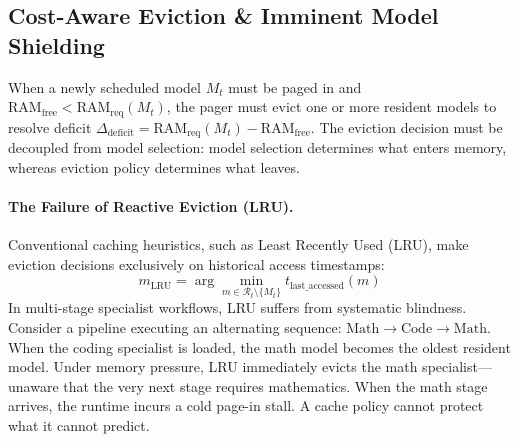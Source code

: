 \subsection{Cost-Aware Eviction \& Imminent Model Shielding}
\label{sec:cost_aware_eviction}

When a newly scheduled model $M_t$ must be paged in and $\text{RAM}_{\text{free}} < \text{RAM}_{\text{req}}(M_t)$, the pager must evict one or more resident models to resolve deficit $\Delta_{\text{deficit}} = \text{RAM}_{\text{req}}(M_t) - \text{RAM}_{\text{free}}$. The eviction decision must be decoupled from model selection: model selection determines what enters memory, whereas eviction policy determines what leaves.

\paragraph{The Failure of Reactive Eviction (LRU).}
Conventional caching heuristics, such as Least Recently Used (LRU), make eviction decisions exclusively on historical access timestamps:
\begin{equation}
m_{\text{LRU}} = \arg\min_{m \in \mathcal{R}_t \setminus \{M_t\}} t_{\text{last\_accessed}}(m)
\end{equation}
In multi-stage specialist workflows, LRU suffers from systematic blindness. Consider a pipeline executing an alternating sequence: $\text{Math} \to \text{Code} \to \text{Math}$. When the coding specialist is loaded, the math model becomes the oldest resident model. Under memory pressure, LRU immediately evicts the math specialist---unaware that the very next stage requires mathematics. When the math stage arrives, the runtime incurs a cold page-in stall. A cache policy cannot protect what it cannot predict.

